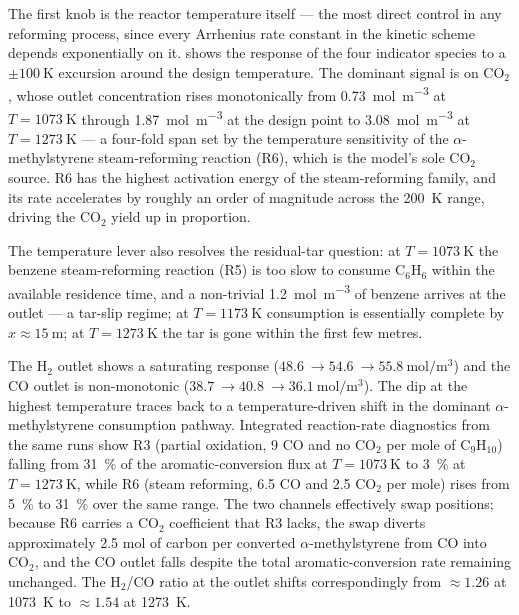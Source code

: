 The first knob is the reactor temperature itself --- the most direct control in any reforming process, since every Arrhenius rate constant in the kinetic scheme depends exponentially on it.  shows the response of the four indicator species to a \(\pm \SI{100}{\kelvin}\) excursion around the design temperature. The dominant signal is on CO\(_2\), whose outlet concentration rises monotonically from \SI{0.73}{\mole\per\metre\cubed} at \(T = \SI{1073}{\kelvin}\) through \SI{1.87}{\mole\per\metre\cubed} at the design point to \SI{3.08}{\mole\per\metre\cubed} at \(T = \SI{1273}{\kelvin}\) --- a four-fold span set by the temperature sensitivity of the \(\alpha\)-methylstyrene steam-reforming reaction (R6), which is the model's sole CO\(_2\) source. R6 has the highest activation energy of the steam-reforming family, and its rate accelerates by roughly an order of magnitude across the \SI{200}{\kelvin} range, driving the CO\(_2\) yield up in proportion. 

The temperature lever also resolves the residual-tar question: at \(T = \SI{1073}{\kelvin}\) the benzene steam-reforming reaction (R5) is too slow to consume C\(_6\)H\(_6\) within the available residence time, and a non-trivial \SI{1.2}{\mole\per\metre\cubed} of benzene arrives at the outlet --- a tar-slip regime; at \(T = \SI{1173}{\kelvin}\) consumption is essentially complete by \(x \approx \SI{15}{\metre}\); at \(T = \SI{1273}{\kelvin}\) the tar is gone within the first few metres.

The H\(_2\) outlet shows a saturating response (\(\SI{48.6}{} \to \SI{54.6}{} \to \SI{55.8}{\mole\per\metre\cubed}\)) and the CO outlet is non-monotonic (\(\SI{38.7}{} \to \SI{40.8}{} \to \SI{36.1}{\mole\per\metre\cubed}\)). The dip at the highest temperature traces back to a temperature-driven shift in the dominant \(\alpha\)-methylstyrene consumption pathway. Integrated reaction-rate diagnostics from the same runs show R3 (partial oxidation, 9 CO and no CO\(_2\) per mole of C\(_9\)H\(_{10}\)) falling from \SI{31}{\percent} of the aromatic-conversion flux at \(T = \SI{1073}{\kelvin}\) to \SI{3}{\percent} at \(T = \SI{1273}{\kelvin}\), while R6 (steam reforming, 6.5 CO and 2.5 CO\(_2\) per mole) rises from \SI{5}{\percent} to \SI{31}{\percent} over the same range. The two channels effectively swap positions; because R6 carries a CO\(_2\) coefficient that R3 lacks, the swap diverts approximately 2.5 mol of carbon per converted \(\alpha\)-methylstyrene from CO into CO\(_2\), and the CO outlet falls despite the total aromatic-conversion rate remaining unchanged. The H\(_2\)/CO ratio at the outlet shifts correspondingly from \(\approx 1.26\) at \SI{1073}{\kelvin} to \(\approx 1.54\) at \SI{1273}{\kelvin}.

